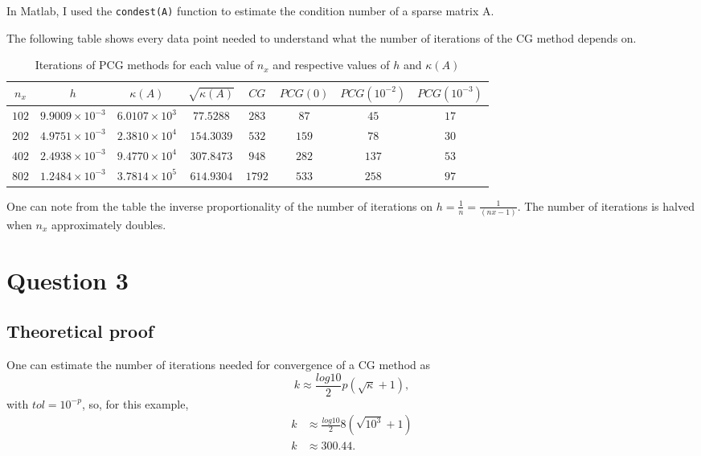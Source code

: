 \documentclass[a4paper, 11pt]{article}
\begin{document}
			In Matlab, I used the \texttt{condest(A)} function to estimate the condition number of a sparse matrix A.
			
			The following table shows every data point needed to understand what the number of iterations of the CG method depends on.
		
			\begin{table}[H]
				\centering
				\begin{tabular}{c|c|c|c|c|c|c|c}
					$n_x$   & $ h $						& $\kappa(A)$			 & $ \sqrt{\kappa(A)} $& $ CG $ & $ PCG(0) $& $PCG(10^{-2})$& $PCG(10^{-3})$ \\ \hline
					$ 102 $ & $ 9.9009 \times 10^{-3} $ & $ 6.0107 \times 10^3 $ & $ 77.5288 $ 		& $ 283 $ 	& $ 87 $ 	& $ 45 $ 		& $ 17 $ 		\\ \hline
					$ 202 $ & $ 4.9751 \times 10^{-3} $ & $ 2.3810 \times 10^4 $ & $ 154.3039 $ 	& $ 532 $ 	& $ 159 $ 	& $ 78 $ 		& $ 30 $ 		\\ \hline
					$ 402 $ & $ 2.4938 \times 10^{-3} $ & $ 9.4770 \times 10^4 $ & $ 307.8473 $ 	& $ 948 $ 	& $ 282 $ 	& $ 137 $ 		& $ 53 $		\\ \hline
					$ 802 $ & $ 1.2484 \times 10^{-3} $ & $ 3.7814 \times 10^5 $ & $ 614.9304 $ 	& $ 1792 $	& $ 533 $ 	& $ 258 $ 		& $ 97 $ 		\\ 
				\end{tabular}
				\caption{Iterations of PCG methods for each value of $n_x$ and respective values of $h$ and $\kappa(A)$}
				\label{table:ex2}
			\end{table}	
		
			One can note from the table the inverse proportionality of the number of iterations on $ h = \frac{1}{n} = \frac{1}{(nx-1)} $.
			The number of iterations is halved when $n_x$ approximately doubles.		
							
		\section*{Question 3}
		
			\subsection*{Theoretical proof}
			
			One can estimate the number of iterations needed for convergence of a CG method as
			\begin{equation}
				k \approx \frac{log10}{2}p(\sqrt{\kappa}+1),
			\end{equation}
			with $tol = 10^{-p}$, so, for this example,
			\begin{align}
				k &\approx \frac{log10}{2}8(\sqrt{10^3}+1) \\
				k &\approx 300.44.		
			\end{align}
		
\end{document}
